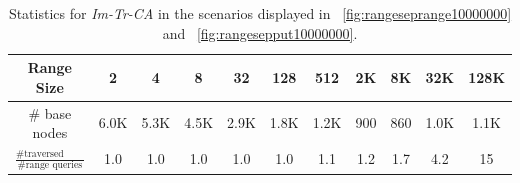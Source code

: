 \documentclass[a4paper,UKenglish]{oasics-v2016}
\begin{document}
 \begin{table}[h]\footnotesize  
  \caption{Statistics for \emph{Im-Tr-CA} in the scenarios displayed in \figurename~\ref{fig:rangeseprange10000000} and \figurename~\ref{fig:rangesepput10000000}.\label{tab:nodestats10000000}}
      \begin{tabular}{c|cccccccccc} %
      Range Size  & 2 & 4 & 8 & 32 & 128 & 512 & 2K & 8K & 32K & 128K \\\hline
      \# base nodes & 6.0K & 5.3K & 4.5K & 2.9K & 1.8K & 1.2K & 900 & 860 & 1.0K & 1.1K \\ 
      $\frac{\text{\# traversed base nodes}}{\text{\# range queries}}$ & 1.0 & 1.0 & 1.0 & 1.0 & 1.0 & 1.1 & 1.2 & 1.7 & 4.2 & 15 \\ %
    \end{tabular}
 \end{table}




 


\end{document}
